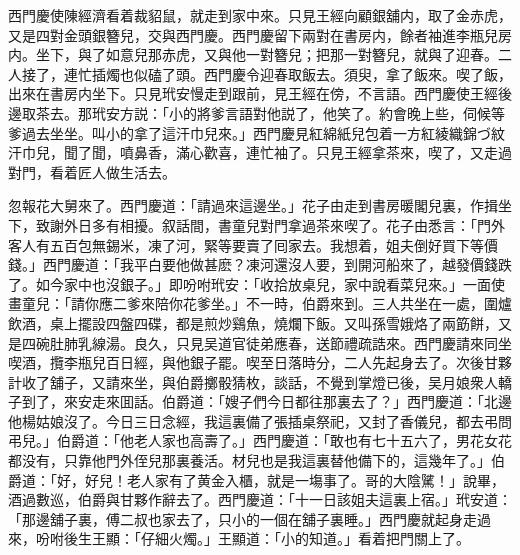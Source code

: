 西門慶使陳經濟看着裁貂鼠，就走到家中來。只見王經向顧銀舖内，取了金赤虎，又是四對金頭銀簪兒，交與西門慶。西門慶留下兩對在書房内，餘者袖進李瓶兒房内。坐下，與了如意兒那赤虎，又與他一對簪兒；把那一對簪兒，就與了迎春。二人接了，連忙插燭也似磕了頭。西門慶令迎春取飯去。須臾，拿了飯來。喫了飯，出來在書房内坐下。只見玳安慢走到跟前，見王經在傍，不言語。西門慶使王經後邊取茶去。那玳安方説：「小的將爹言語對他説了，他笑了。約會晚上些，伺候等爹過去坐坐。叫小的拿了這汗巾兒來。」西門慶見紅綿紙兒包着一方紅綾織錦づ紋汗巾兒，聞了聞，噴鼻香，滿心歡喜，連忙袖了。只見王經拿茶來，喫了，又走過對門，看着匠人做生活去。

忽報花大舅來了。西門慶道：「請過來這邊坐。」花子由走到書房暖閣兒裏，作揖坐下，致謝外日多有相擾。叙話間，書童兒對門拿過茶來喫了。花子由悉言：「門外客人有五百包無錫米，凍了河，緊等要賣了囘家去。我想着，姐夫倒好買下等價錢。」西門慶道：「我平白要他做甚麽？凍河還沒人要，到開河船來了，越發價錢跌了。如今家中也沒銀子。」即吩咐玳安：「收拾放桌兒，家中說看菜兒來。」一面使畫童兒：「請你應二爹來陪你花爹坐。」不一時，伯爵來到。三人共坐在一處，圍爐飲酒，桌上擺設四盤四碟，都是煎炒鷄魚，燒爛下飯。又叫孫雪娥烙了兩筯餅，又是四碗肚肺乳線湯。良久，只見吴道官徒弟應春，送節禮疏誥來。西門慶請來同坐喫酒，攬李瓶兒百日經，與他銀子罷。喫至日落時分，二人先起身去了。次後甘夥計收了舖子，又請來坐，與伯爵擲骰猜枚，談話，不覺到掌燈已後，吴月娘衆人轎子到了，來安走來囬話。伯爵道：「嫂子們今日都往那裏去了？」西門慶道：「北邊他楊姑娘沒了。今日三日念經，我這裏備了張插桌祭祀，又封了香儀兒，都去弔問弔兒。」伯爵道：「他老人家也高壽了。」西門慶道：「敢也有七十五六了，男花女花都没有，只靠他門外侄兒那裏養活。材兒也是我這裏替他備下的，這幾年了。」伯爵道：「好，好兒！老人家有了黄金入櫃，就是一塲事了。哥的大陰騭！」說畢，酒過數巡，伯爵與甘夥作辭去了。西門慶道：「十一日該姐夫這裏上宿。」玳安道：「那邊舖子裏，傅二叔也家去了，只小的一個在舖子裏睡。」西門慶就起身走過來，吩咐後生王顯：「仔細火燭。」王顯道：「小的知道。」看着把門關上了。

